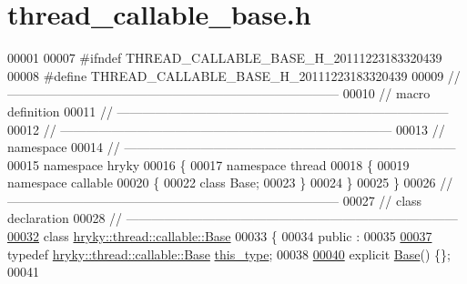 \hypertarget{thread__callable__base_8h_source}{\section{thread\-\_\-callable\-\_\-base.\-h}
}

\begin{DoxyCode}
00001 
00007 \textcolor{preprocessor}{#ifndef THREAD\_CALLABLE\_BASE\_H\_20111223183320439}
00008 \textcolor{preprocessor}{}\textcolor{preprocessor}{#define THREAD\_CALLABLE\_BASE\_H\_20111223183320439}
00009 \textcolor{preprocessor}{}\textcolor{comment}{//
      ------------------------------------------------------------------------------}
00010 \textcolor{comment}{// macro definition}
00011 \textcolor{comment}{//
      ------------------------------------------------------------------------------}
00012 \textcolor{comment}{//
      ------------------------------------------------------------------------------}
00013 \textcolor{comment}{// namespace}
00014 \textcolor{comment}{//
      ------------------------------------------------------------------------------}
00015 \textcolor{keyword}{namespace }hryky
00016 \{
00017 \textcolor{keyword}{namespace }thread
00018 \{
00019 \textcolor{keyword}{namespace }callable
00020 \{
00022     \textcolor{keyword}{class }Base;
00023 \}
00024 \}
00025 \}
00026 \textcolor{comment}{//
      ------------------------------------------------------------------------------}
00027 \textcolor{comment}{// class declaration}
00028 \textcolor{comment}{//
      ------------------------------------------------------------------------------}
\hypertarget{thread__callable__base_8h_source_l00032}{}\hyperlink{classhryky_1_1thread_1_1callable_1_1_base}{00032} \textcolor{comment}{}\textcolor{keyword}{class }\hyperlink{classhryky_1_1thread_1_1callable_1_1_base}{hryky::thread::callable::Base}
00033 \{
00034 \textcolor{keyword}{public} :
00035 
\hypertarget{thread__callable__base_8h_source_l00037}{}\hyperlink{classhryky_1_1thread_1_1callable_1_1_base_ad3922e54cf5990b08625fad40aae60b3}{00037}     \textcolor{keyword}{typedef} \hyperlink{classhryky_1_1thread_1_1callable_1_1_base}{hryky::thread::callable::Base} \hyperlink{classhryky_1_1thread_1_1callable_1_1_base_ad3922e54cf5990b08625fad40aae60b3}{this_type};
00038 
\hypertarget{thread__callable__base_8h_source_l00040}{}\hyperlink{classhryky_1_1thread_1_1callable_1_1_base_aeda337d4158d695451f0dabc9d88cf58}{00040}     \textcolor{keyword}{explicit} \hyperlink{classhryky_1_1thread_1_1callable_1_1_base_aeda337d4158d695451f0dabc9d88cf58}{Base}() \{\};
00041 

\end{DoxyCode}
